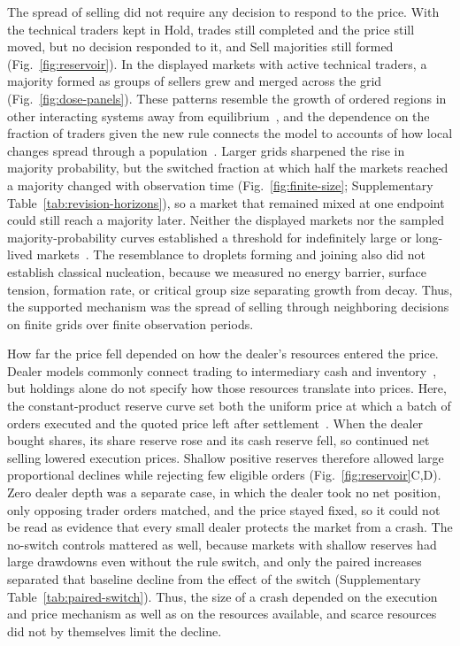 The spread of selling did not require any decision to respond to the
price. With the technical traders kept in Hold, trades still completed and the
price still moved, but no decision responded to it, and Sell majorities
still formed (Fig.~\ref{fig:reservoir}). In the displayed markets with active technical traders, a
majority formed as groups of sellers grew and merged across the grid
(Fig.~\ref{fig:dose-panels}). These patterns resemble the growth of
ordered regions in other interacting systems away from
equilibrium~\cite{hinrichsen2000nonequilibrium,bray1994theory}, and the
dependence on the fraction of traders given the new rule connects the
model to accounts of how local changes spread through a
population~\cite{granovetter1978threshold,watts2002simple,aizenman1988metastability,holroyd2003sharp}.
Larger grids sharpened the rise in majority probability, but the
switched fraction at which half the markets reached a majority changed
with observation time
(Fig.~\ref{fig:finite-size}; Supplementary
Table~\ref{tab:revision-horizons}), so a market that remained mixed at
one endpoint could still reach a majority later. Neither the displayed
markets nor the sampled majority-probability curves established a
threshold for indefinitely large or long-lived
markets~\cite{binder1981finite,landau2021guide}. The resemblance to
droplets forming and joining also did not establish classical
nucleation, because we measured no energy barrier, surface tension,
formation rate, or critical group size separating growth from decay.
Thus, the supported mechanism was the spread of selling through
neighboring decisions on finite grids over finite observation periods.

How far the price fell depended on how the dealer's resources entered
the price. Dealer models commonly connect trading to intermediary cash
and
inventory~\cite{garman1976market,stoll1978supply,ho1981optimal,braunmunzinger2018agent},
but holdings alone do not specify how those resources translate into
prices. Here, the constant-product reserve curve set both the uniform
price at which a batch of orders executed and the quoted price left
after settlement~\cite{angeris2022constant}. When the dealer bought
shares, its share reserve rose and its cash reserve fell, so continued net
selling lowered execution prices. Shallow positive reserves therefore
allowed large proportional declines while rejecting few eligible orders
(Fig.~\ref{fig:reservoir}C,D). Zero dealer depth was a separate case, in
which the dealer took no net position, only opposing trader orders
matched, and the price stayed fixed, so it could not be read as evidence that every small dealer protects the market from a crash. The no-switch
controls mattered as well, because markets with shallow reserves had
large drawdowns even without the rule switch, and only the paired
increases separated that baseline decline from the effect of the switch
(Supplementary Table~\ref{tab:paired-switch}). Thus, the size of a crash
depended on the execution and price mechanism as well as on the
resources available, and scarce resources did not by themselves limit
the decline.

